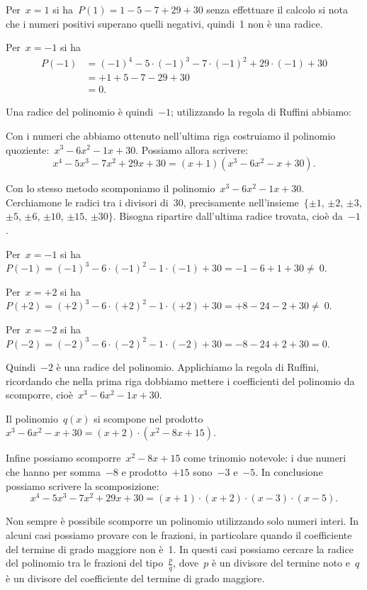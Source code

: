 \begin{exrig}
Per~$x=1$ si ha~$P(1)=1-5-7+29+30$ senza effettuare il calcolo si
nota che i numeri positivi superano quelli negativi, quindi~1 non è
una radice.

Per~$x=-1$ si ha
\begin{align*}
P(-1)&=(-1)^{4}-5\cdot (-1)^{3}-7\cdot(-1)^{2}+29\cdot (-1)+30\\
&=+1+5-7-29+30\\
&=0.
\end{align*}

Una radice del polinomio è quindi~$-1$; utilizzando la regola di Ruffini
abbiamo:
\begin{center}
 
\end{center}
Con i numeri che abbiamo ottenuto nell'ultima riga
costruiamo il polinomio quoziente:~$x^{3}-6x^{2}-1x+30$. Possiamo allora
scrivere:
\[x^{4}-5x^{3}-7x^{2}+29x+30=(x+1)(x^{3}-6x^{2}-x+30).\]

Con lo stesso metodo scomponiamo il polinomio~$x^{3}-6x^{2}-1x+30$.
Cerchiamone le radici tra i divisori di~30, precisamente
nell'insieme~$\{\pm 1$, $\pm 2$, $\pm 3$, $\pm 5$, $\pm 6$, $\pm 10$, $\pm 15$, $\pm 30\}$. Bisogna ripartire dall'ultima
radice trovata, cioè da~$-1$.

Per~$x=-1$ si ha~$P(-1)=(-1)^{3}-6\cdot (-1)^{2}-1\cdot (-1)+30=-1-6+1+30\neq~0$.

Per~$x=+2$ si ha~$P(+2)=(+2)^{3}-6\cdot (+2)^{2}-1\cdot (+2)+30=+8-24-2+30\neq~0$.

Per~$x=-2$ si ha~$P(-2)=(-2)^{3}-6\cdot (-2)^{2}-1\cdot (-2)+30=-8-24+2+30=0$.

Quindi~$-2$ è una radice del polinomio. Applichiamo la regola di
Ruffini, ricordando che nella prima riga dobbiamo mettere i coefficienti
del polinomio da scomporre, cioè~$x^{3}-6x^{2}-1x+30$.
\begin{center}
 
\end{center}
Il polinomio~$q(x)$ si scompone nel
prodotto~$x^{3}-6x^{2}-x+30=(x+2)\cdot (x^{2}-8x+15)$.

Infine possiamo scomporre~$x^{2}-8x+15$ come trinomio notevole: i due
numeri che hanno per somma~$-8$ e prodotto~$+15$ sono~$-3$ e~$-5$. In
conclusione possiamo scrivere la scomposizione:
\[x^{4}-5x^{3}-7x^{2}+29x+30=(x+1)\cdot (x+2)\cdot (x-3)\cdot (x-5).\]

Non sempre è possibile scomporre un polinomio utilizzando solo numeri
interi. In alcuni casi possiamo provare con le frazioni, in particolare
quando il coefficiente del termine di grado maggiore non è~1. In
questi casi possiamo cercare la radice del polinomio tra le frazioni
del tipo~$\frac{p}{q}$, dove~$p$ è un divisore del termine noto e~$q$ è
un divisore del coefficiente del termine di grado maggiore.



\end{exrig}
